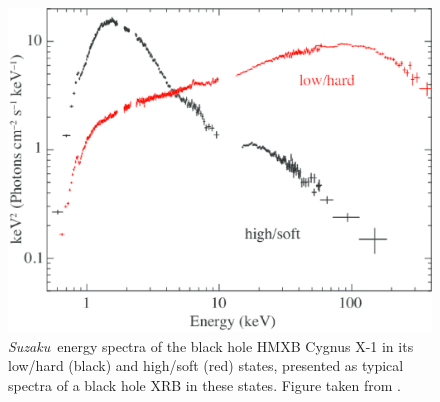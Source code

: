 \begin{figure}
   \centering
    \includegraphics[width=\columnwidth, trim = 0mm 0mm 0mm 0mm, clip]{images/Yamada_Spec.eps}
    \captionsetup{singlelinecheck=off}
    \caption[Energy spectra of the black hole HMXB Cygnus X-1 in its low/hard and high/soft states, presented as typical spectra of a black hole XRB in these states.]{\textit{Suzaku}\indexsuzaku\ energy spectra of the black hole HMXB Cygnus X-1 in its low/hard (black) and high/soft (red) states, presented as typical spectra of a black hole XRB in these states.  Figure taken from \citet{Yamada_Spec}.}
   \label{fig:Yamada_Spec}
\end{figure}

